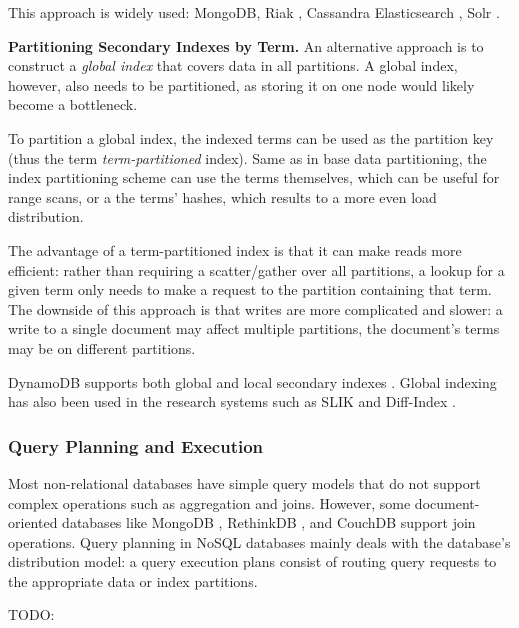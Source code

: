 This approach is widely used: MongoDB, Riak \cite{riakv:secondaryindexes}, Cassandra \cite{cassandra:secondaryindexing}
Elasticsearch \cite{elastic:docrouting}, Solr \cite{solr:indexsharding}.

\bigskip

\noindent
\textbf{Partitioning Secondary Indexes by Term.}
An alternative approach is to construct a \textit{global index} that covers data in all partitions.
A global index, however, also needs to be partitioned, as storing it on one node would likely become a bottleneck.

To partition a global index, the indexed terms can be used as the partition key (thus the term \textit{term-partitioned}
index).
Same as in base data partitioning, the index partitioning scheme can use the terms themselves, which can be useful for
range scans, or a the terms' hashes, which results to a more even load distribution.

The advantage of a term-partitioned index is that it can make reads more efficient:
rather than requiring a scatter/gather over all partitions, a lookup for a given term only needs to make a request to the
partition containing that term.
The downside of this approach is that writes are more complicated and slower:
a write to a single document may affect multiple partitions, the document's terms may be on different partitions.

DynamoDB supports both global and local secondary indexes \cite{dynamodb:secondaryindexes}.
Global indexing has also been used in the research systems such as SLIK \cite{kejriwal:slik} and Diff-Index \cite{tan:diffindex}.

\subsubsection{Query Planning and Execution}

Most non-relational databases have simple query models that do not support complex operations such as aggregation and
joins.
However, some document-oriented databases like MongoDB \cite{mongodb:joins}, RethinkDB \cite{rethinkdb:joins}, and CouchDB \cite{couchdb:joins} support join operations.
Query planning in NoSQL databases mainly deals with the database's distribution model:
a query execution plans consist of routing query requests to the appropriate data or index partitions.

TODO:


